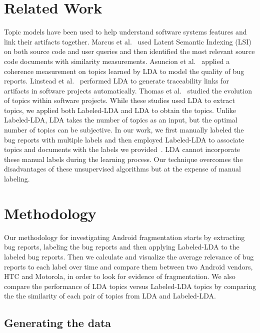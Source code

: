 \documentclass[10pt, conference, compsocconf]{IEEEtran}
\begin{document}
\section{Related Work}
\label{sec:relatedwork}
Topic models have been used to help understand software systems
features and link their artifacts together.
Marcus et al.~\cite{Marcus04aninformation} used Latent Semantic
Indexing (LSI) on both source code and user queries and then
identified the most relevant source code documents with similarity
measurements. 
Asuncion et al.~\cite{Asuncion:2010} applied a coherence measurement
on topics learned by LDA to model the quality of bug reports. 
Linstead et al.~\cite{Linstead:2009} performed LDA to generate
traceability links for artifacts in software projects automatically. 
Thomas et al.~\cite{Thomas:2011} studied
the evolution of topics within software projects.
While these studies used 
 LDA to extract topics,  we applied both Labeled-LDA and LDA to
obtain the topics. 
Unlike Labeled-LDA, LDA takes the number of topics as an input, but
the optimal number of topics can be subjective.
In our work, we first manually labeled the bug reports with multiple
labels and then employed
Labeled-LDA to associate topics and documents with the labels we
provided~\cite{labeledlda}. 
LDA cannot incorporate these manual labels during the learning process.
Our technique overcomes the disadvantages of these unsupervised
algorithms but at the expense of manual labeling.



\section{Methodology}
\label{sec:methodology}

Our methodology for investigating Android fragmentation starts by extracting
bug reports, labeling the bug reports and then applying
Labeled-LDA to the labeled bug reports.
Then 
 we calculate and visualize the average relevance of bug reports to each label
over time and compare them between two Android vendors,
HTC and Motorola, in order to look for evidence of fragmentation.
We also compare the performance of LDA topics versus
Labeled-LDA topics by comparing the 
the similarity of each pair of
topics from LDA and Labeled-LDA.

\subsection{Generating the data}
\end{document}
